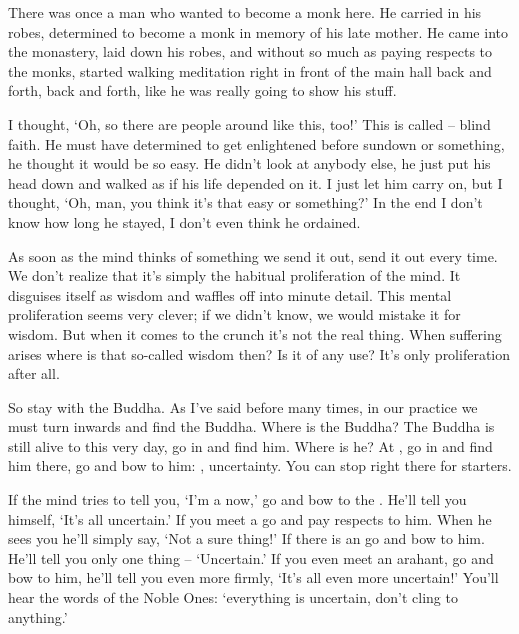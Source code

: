 There was once a man who wanted to become a monk here. He carried in his robes, determined to become a monk in memory of his late mother. He came into the monastery, laid down his robes, and without so much as paying respects to the monks, started walking meditation right in front of the main hall back and forth, back and forth, like he was really going to show his stuff.

I thought, `Oh, so there are people around like this, too!' This is called   -- blind faith. He must have determined to get enlightened before sundown or something, he thought it would be so easy. He didn't look at anybody else, he just put his head down and walked as if his life depended on it. I just let him carry on, but I thought, `Oh, man, you think it's that easy or something?' In the end I don't know how long he stayed, I don't even think he ordained.

As soon as the mind thinks of something we send it out, send it out every time. We don't realize that it's simply the habitual proliferation of the mind. It disguises itself as wisdom and waffles off into minute detail. This mental proliferation seems very clever; if we didn't know, we would mistake it for wisdom. But when it comes to the crunch it's not the real thing. When suffering arises where is that so-called wisdom then? Is it of any use? It's only proliferation after all.

So stay with the Buddha. As I've said before many times, in our practice we must turn inwards and find the Buddha. Where is the Buddha? The Buddha is still alive to this very day, go in and find him. Where is he? At , go in and find him there, go and bow to him: , uncertainty. You can stop right there for starters.

If the mind tries to tell you, `I'm a  now,' go and bow to the . He'll tell you himself, `It's all uncertain.' If you meet a  go and pay respects to him. When he sees you he'll simply say, `Not a sure thing!' If there is an  go and bow to him. He'll tell you only one thing -- `Uncertain.' If you even meet an arahant, go and bow to him, he'll tell you even more firmly, `It's all even more uncertain!' You'll hear the words of the Noble Ones: `everything is uncertain, don't cling to \mbox{anything.'}

